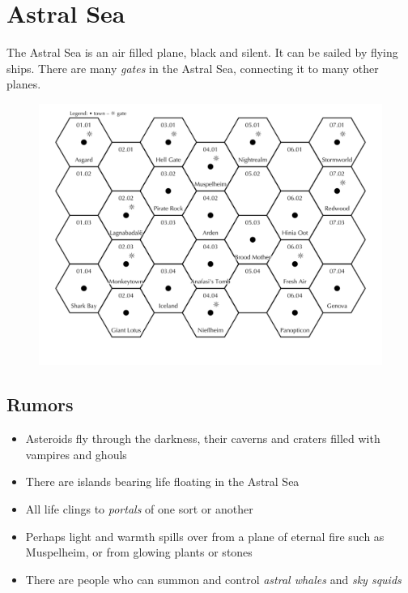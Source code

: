 \documentclass[11pt]{bxart}
\begin{document}
\section{Astral Sea}

The Astral Sea is an air filled plane, black and silent. It can be
sailed by flying ships. There are many \textit{gates} in the Astral
Sea, connecting it to many other planes.

\begin{figure}
  \centering
  \includegraphics[width=15cm]{Astral-Sea.jpg}
\end{figure}

\subsection{Rumors}

\begin{itemize}
\item Asteroids fly through the darkness, their caverns and craters
  filled with vampires and ghouls
\item There are islands bearing life floating in the Astral Sea
\item All life clings to \textit{portals} of one sort or another
\item Perhaps light and warmth spills over from a plane of eternal
  fire such as Muspelheim, or from glowing plants or stones
\item There are people who can summon and control \textit{astral
  whales} and \textit{sky squids}
\end{itemize}
\end{document}
